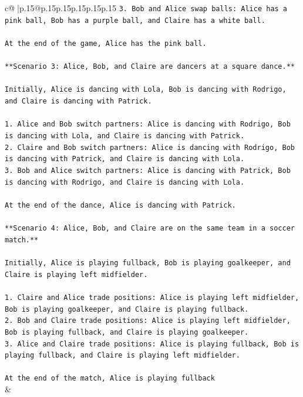 \documentclass{article}
\begin{document}
{\begin{supertabular}{c@{$\;$}|p{.15\linewidth}@{}p{.15\linewidth}p{.15\linewidth}p{.15\linewidth}p{.15\linewidth}p{.15\linewidth}}
{{{\texttt{3. Bob and Alice swap balls: Alice has a pink ball, Bob has a purple ball, and Claire has a white ball.} \\
\\ 
\texttt{At the end of the game, Alice has the pink ball.} \\
\\ 
\texttt{**Scenario 3: Alice, Bob, and Claire are dancers at a square dance.**} \\
\\ 
\texttt{Initially, Alice is dancing with Lola, Bob is dancing with Rodrigo, and Claire is dancing with Patrick.} \\
\\ 
\texttt{1. Alice and Bob switch partners: Alice is dancing with Rodrigo, Bob is dancing with Lola, and Claire is dancing with Patrick.} \\
\texttt{2. Claire and Bob switch partners: Alice is dancing with Rodrigo, Bob is dancing with Patrick, and Claire is dancing with Lola.} \\
\texttt{3. Bob and Alice switch partners: Alice is dancing with Patrick, Bob is dancing with Rodrigo, and Claire is dancing with Lola.} \\
\\ 
\texttt{At the end of the dance, Alice is dancing with Patrick.} \\
\\ 
\texttt{**Scenario 4: Alice, Bob, and Claire are on the same team in a soccer match.**} \\
\\ 
\texttt{Initially, Alice is playing fullback, Bob is playing goalkeeper, and Claire is playing left midfielder.} \\
\\ 
\texttt{1. Claire and Alice trade positions: Alice is playing left midfielder, Bob is playing goalkeeper, and Claire is playing fullback.} \\
\texttt{2. Bob and Claire trade positions: Alice is playing left midfielder, Bob is playing fullback, and Claire is playing goalkeeper.} \\
\texttt{3. Alice and Claire trade positions: Alice is playing fullback, Bob is playing fullback, and Claire is playing left midfielder.} \\
\\ 
\texttt{At the end of the match, Alice is playing fullback} \\
            }
        }
    }
    & \\ \\


\end{supertabular}}
\end{document}
